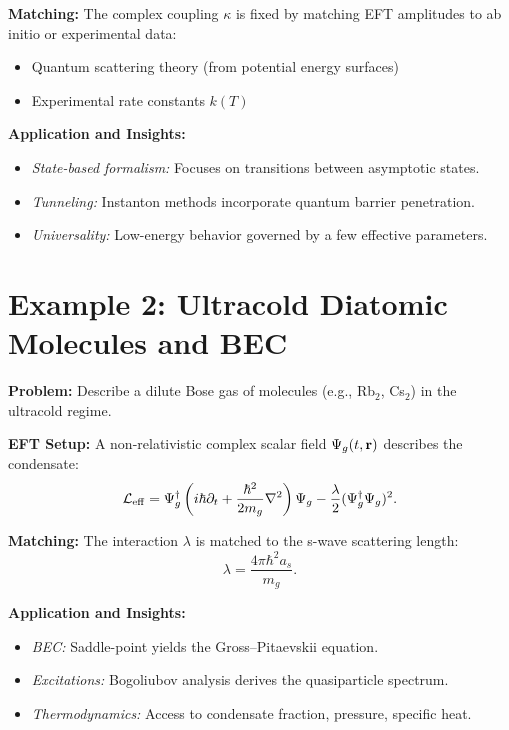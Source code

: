 \textbf{Matching:} The complex coupling \(\kappa\) is fixed by matching EFT amplitudes to ab initio or experimental data:
\begin{itemize}
  \item Quantum scattering theory (from potential energy surfaces)
  \item Experimental rate constants \(k(T)\)
\end{itemize}

\textbf{Application and Insights:}
\begin{itemize}
  \item \emph{State-based formalism:} Focuses on transitions between asymptotic states.
  \item \emph{Tunneling:} Instanton methods incorporate quantum barrier penetration.
  \item \emph{Universality:} Low-energy behavior governed by a few effective parameters.
\end{itemize}

\section{Example 2: Ultracold Diatomic Molecules and BEC}
\label{sec:example_ultracold}

\textbf{Problem:} Describe a dilute Bose gas of molecules (e.g., Rb\(_2\), Cs\(_2\)) in the ultracold regime.

\textbf{EFT Setup:} A non-relativistic complex scalar field \(\Psi_g(t, \vb{r})\) describes the condensate:
\begin{equation}
\mathcal{L}_{\mathrm{eff}} = \Psi^\dagger_g \left(i\hbar\partial_t + \frac{\hbar^2}{2m_g} \nabla^2\right) \Psi_g - \frac{\lambda}{2} (\Psi^\dagger_g \Psi_g)^2.
\end{equation}

\textbf{Matching:} The interaction \(\lambda\) is matched to the s-wave scattering length:
\begin{equation}
\lambda = \frac{4\pi\hbar^2 a_s}{m_g}.
\end{equation}

\textbf{Application and Insights:}
\begin{itemize}
  \item \emph{BEC:} Saddle-point yields the Gross--Pitaevskii equation.
  \item \emph{Excitations:} Bogoliubov analysis derives the quasiparticle spectrum.
  \item \emph{Thermodynamics:} Access to condensate fraction, pressure, specific heat.
\end{itemize}

